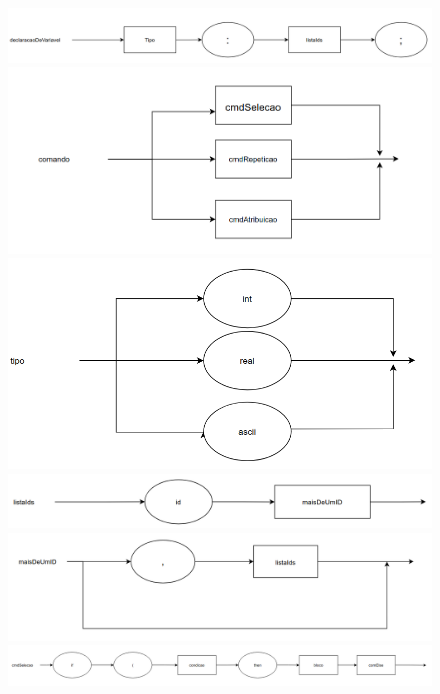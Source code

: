 \documentclass[11pt]{article}
\begin{document}
\newpage

\begin{figure}[H]
   \includegraphics[]{grafos_sintaticos/declaracao_de_variavel.png}

   \includegraphics[]{grafos_sintaticos/comando.png}

   \includegraphics[]{grafos_sintaticos/tipo.png}

   \includegraphics[]{grafos_sintaticos/lista_ids.png}

   \includegraphics[]{grafos_sintaticos/mais_de_um_id.png}

   \includegraphics[scale=1.5]{grafos_sintaticos/cmd_selecao.png}



  
\end{figure}
\end{document}
